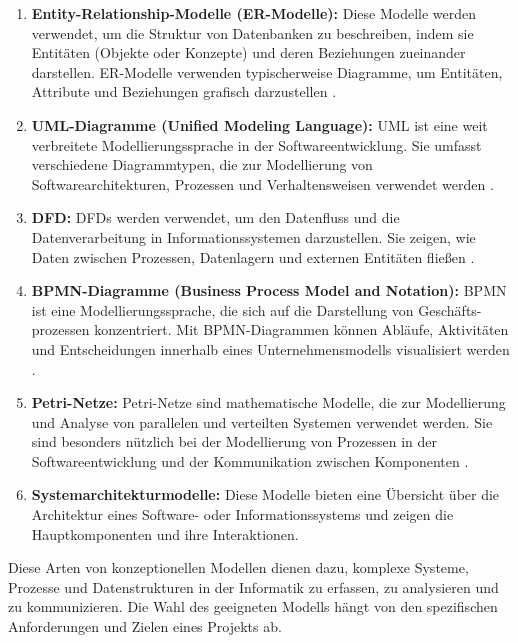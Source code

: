 \begin{enumerate}
    \item \textbf{Entity-Relationship-Modelle (ER-Modelle):} Diese Modelle werden verwendet, um die Struktur von Datenbanken zu beschreiben, indem sie Entitäten (Objekte oder Konzepte) und deren Beziehungen zueinander darstellen. ER-Modelle verwenden typischerweise Diagramme, um Entitäten, Attribute und Beziehungen grafisch darzustellen \cite{gregersen1999temporal}.
    
    \item \textbf{UML-Diagramme (Unified Modeling Language):} UML ist eine weit verbreitete Modellierungssprache in der Softwareentwicklung. Sie umfasst verschiedene Diagrammtypen, die zur Modellierung von Softwarearchitekturen, Prozessen und Verhaltensweisen verwendet werden \cite{reggio2013used}. 
    
    \item \textbf{\ac{DFD}:} DFDs werden verwendet, um den Datenfluss und die Datenverarbeitung in Informationssystemen darzustellen. Sie zeigen, wie Daten zwischen Prozessen, Datenlagern und externen Entitäten fließen \cite{li2009data}.
    
    \item \textbf{BPMN-Diagramme (Business Process Model and Notation):} BPMN ist eine Modellierungssprache, die sich auf die Darstellung von Geschäfts-prozessen konzentriert. Mit BPMN-Diagrammen können Abläufe, Aktivitäten und Entscheidungen innerhalb eines Unternehmensmodells visualisiert werden \cite{white2004introduction}.
    
    \item \textbf{Petri-Netze:} Petri-Netze sind mathematische Modelle, die zur Modellierung und Analyse von parallelen und verteilten Systemen verwendet werden. Sie sind besonders nützlich bei der Modellierung von Prozessen in der Softwareentwicklung und der Kommunikation zwischen Komponenten \cite{petri2008petri}.
    \item \textbf{Systemarchitekturmodelle:} Diese Modelle bieten eine Übersicht über die Architektur eines Software- oder Informationssystems und zeigen die Hauptkomponenten und ihre Interaktionen.
\end{enumerate}

Diese Arten von konzeptionellen Modellen dienen dazu, komplexe Systeme, Prozesse und Datenstrukturen in der Informatik zu erfassen, zu analysieren und zu kommunizieren. Die Wahl des geeigneten Modells hängt von den spezifischen Anforderungen und Zielen eines Projekts ab. 

